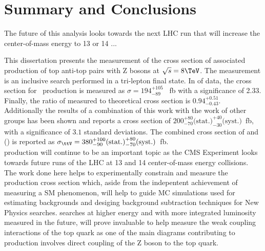\chapter{Summary and Conclusions}
\label {ch:conclusion}

The future of this analysis looks towards the next LHC run that will increase
the center-of-mass energy to 13 or 14 \TeV...


This dissertation presents the measurement of the cross section of associated production of top anti-top pairs with Z bosons at $\sqrt{s} = 8 \TeV$. The measurement is an inclusive search performed in a tri-lepton final state. In \intLumi of data, the cross section for \ttZ \ production is measured as $\sigma=194 _{-89} ^{+105}$ \ fb with a significance of 2.33. Finally, the ratio of measured to theoretical cross section is $0.94_{-0.43} ^{+0.51}$.\\

Additionally the results of a combination of this work with the work of other groups has been shown and reports a \ttZ cross section of 
$200 ^{+80}_{-70} \textrm{(stat.)} ^{+40}_{-30} \textrm{(syst.)}$~fb, with a significance of $3.1$ standard deviations. The combined cross section of \ttZ and \ttW (\ttV) is reported as $\sigma_{\ttV} = 380 ^{+100}_{-90} \textrm{(stat.)} ^{+80}_{-70} \textrm{(syst.)}$~fb.\\

\ttZ production will continue to be an important topic as the CMS Experiment looks towards future runs of the LHC at 13 and 14 \TeV center-of-mass energy collisions. The work done here helps to experimentally constrain and measure the \ttZ production cross section which, aside from the indepentent achievement of measuring a SM phenomenon, will help to guide MC simulations used for estimating backgrounds and desiging background subtraction techniques for New Physics searches. \ttZ searches at higher energy and with more integrated luminosity measured in the future, will prove invaluable to help measure the weak coupling interactions of the top quark as one of the main diagrams contributing to \ttZ production involves direct coupling of the Z boson to the top quark.\\ 
